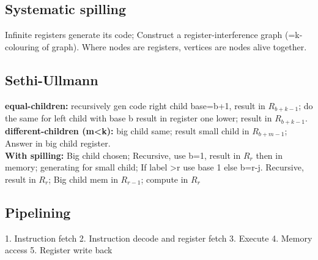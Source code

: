 \subsection*{Systematic spilling}
Infinite registers generate its code; Construct a register-interference graph (=k-colouring of graph). Where nodes are registers, vertices are nodes alive together.
\subsection*{Sethi-Ullmann}
\textbf{equal-children:} recursively gen code right child base=b+1, result in $R_{b+k-1}$; do the same for left child with base b result in register one lower; result in $R_{b+k-1}$.\\
\textbf{different-children (m<k):} big child same; result small child in $R_{b+m-1}$; Answer in big child register.\\
\textbf{With spilling:} Big child chosen; Recursive, use b=1, result in $R_r$ then in memory; generating for small child; If label >r use base 1 else b=r-j. Recursive, result in $R_r$; Big child mem in $R_{r-1}$; compute in $R_r$
\subsection*{Pipelining}
1. Instruction fetch 2. Instruction decode and register fetch 3. Execute 4. Memory access 5. Register write back

